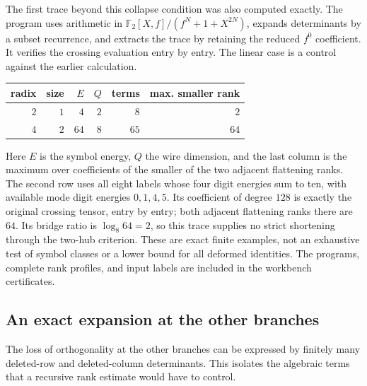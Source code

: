 The first trace beyond this collapse condition was also computed exactly. The program uses arithmetic in
$\mathbb F_2[X,f]/(f^N+1+X^{2N})$, expands determinants by a subset recurrence, and extracts the trace by retaining the reduced $f^0$ coefficient. It verifies the crossing evaluation entry by entry. The linear case is a control against the earlier calculation.
\begin{center}
\begin{tabular}{rrrrrr}
radix & size & $E$ & $Q$ & terms & max. smaller rank\\\hline
$2$ & $1$ & $4$ & $2$ & $8$ & $2$\\
$4$ & $2$ & $64$ & $8$ & $65$ & $64$
\end{tabular}
\end{center}
Here $E$ is the symbol energy, $Q$ the wire dimension, and the last column is the maximum over coefficients of the smaller of the two adjacent flattening ranks. The second row uses all eight labels whose four digit energies sum to ten, with available mode digit energies $0,1,4,5$. Its coefficient of degree $128$ is exactly the original crossing tensor, entry by entry; both adjacent flattening ranks there are $64$. Its bridge ratio is $\log_8 64=2$, so this trace supplies no strict shortening through the two-hub criterion. These are exact finite examples, not an exhaustive test of symbol classes or a lower bound for all deformed identities. The programs, complete rank profiles, and input labels are included in the workbench certificates.

\subsection{An exact expansion at the other branches}
The loss of orthogonality at the other branches can be expressed by finitely many deleted-row and deleted-column determinants. This isolates the algebraic terms that a recursive rank estimate would have to control.

